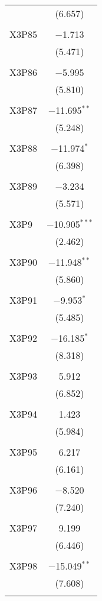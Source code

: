 \begin{table}[!htbp]
\begin{tabular}{@{\extracolsep{5pt}}lc}
  & (6.657) \\ 
  & \\ 
 X3P85 & $-$1.713 \\ 
  & (5.471) \\ 
  & \\ 
 X3P86 & $-$5.995 \\ 
  & (5.810) \\ 
  & \\ 
 X3P87 & $-$11.695$^{**}$ \\ 
  & (5.248) \\ 
  & \\ 
 X3P88 & $-$11.974$^{*}$ \\ 
  & (6.398) \\ 
  & \\ 
 X3P89 & $-$3.234 \\ 
  & (5.571) \\ 
  & \\ 
 X3P9 & $-$10.905$^{***}$ \\ 
  & (2.462) \\ 
  & \\ 
 X3P90 & $-$11.948$^{**}$ \\ 
  & (5.860) \\ 
  & \\ 
 X3P91 & $-$9.953$^{*}$ \\ 
  & (5.485) \\ 
  & \\ 
 X3P92 & $-$16.185$^{*}$ \\ 
  & (8.318) \\ 
  & \\ 
 X3P93 & 5.912 \\ 
  & (6.852) \\ 
  & \\ 
 X3P94 & 1.423 \\ 
  & (5.984) \\ 
  & \\ 
 X3P95 & 6.217 \\ 
  & (6.161) \\ 
  & \\ 
 X3P96 & $-$8.520 \\ 
  & (7.240) \\ 
  & \\ 
 X3P97 & 9.199 \\ 
  & (6.446) \\ 
  & \\ 
 X3P98 & $-$15.049$^{**}$ \\ 
  & (7.608) \\ 
  & \\ 

\end{tabular}
\end{table}
